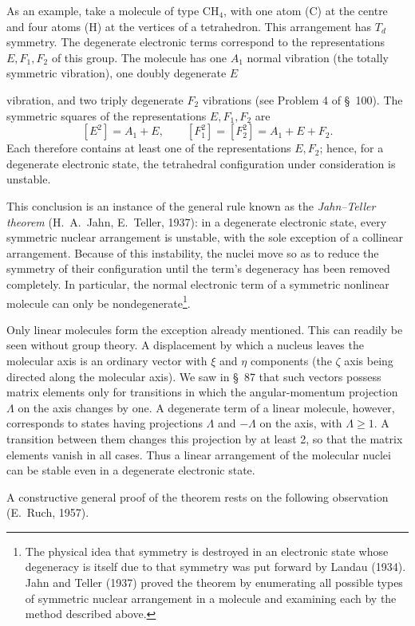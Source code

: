 As an example, take a molecule of type $\mathrm{CH}_4$, with one atom (C) at the centre and four atoms (H) at the vertices of a tetrahedron. This arrangement has $T_d$ symmetry. The degenerate electronic terms correspond to the representations $E,F_1,F_2$ of this group. The molecule has one $A_1$ normal vibration (the totally symmetric vibration), one doubly degenerate $E$

vibration, and two triply degenerate $F_2$ vibrations (see Problem 4 of \S~100). The symmetric squares of the representations $E,F_1,F_2$ are
\[
 [E^2]=A_1+E,\qquad [F_1^2]=[F_2^2]=A_1+E+F_2.
\]
Each therefore contains at least one of the representations $E,F_2$; hence, for a degenerate electronic state, the tetrahedral configuration under consideration is unstable.

This conclusion is an instance of the general rule known as the \emph{Jahn--Teller theorem} (H.~A.~Jahn, E.~Teller, 1937): in a degenerate electronic state, every symmetric nuclear arrangement is unstable, with the sole exception of a collinear arrangement. Because of this instability, the nuclei move so as to reduce the symmetry of their configuration until the term's degeneracy has been removed completely. In particular, the normal electronic term of a symmetric nonlinear molecule can only be nondegenerate\footnote{The physical idea that symmetry is destroyed in an electronic state whose degeneracy is itself due to that symmetry was put forward by Landau (1934). Jahn and Teller (1937) proved the theorem by enumerating all possible types of symmetric nuclear arrangement in a molecule and examining each by the method described above.}.

Only linear molecules form the exception already mentioned. This can readily be seen without group theory. A displacement by which a nucleus leaves the molecular axis is an ordinary vector with $\xi$ and $\eta$ components (the $\zeta$ axis being directed along the molecular axis). We saw in \S~87 that such vectors possess matrix elements only for transitions in which the angular-momentum projection $\Lambda$ on the axis changes by one. A degenerate term of a linear molecule, however, corresponds to states having projections $\Lambda$ and $-\Lambda$ on the axis, with $\Lambda\geqslant1$. A transition between them changes this projection by at least 2, so that the matrix elements vanish in all cases. Thus a linear arrangement of the molecular nuclei can be stable even in a degenerate electronic state.

A constructive general proof of the theorem rests on the following observation (E.~Ruch, 1957).

